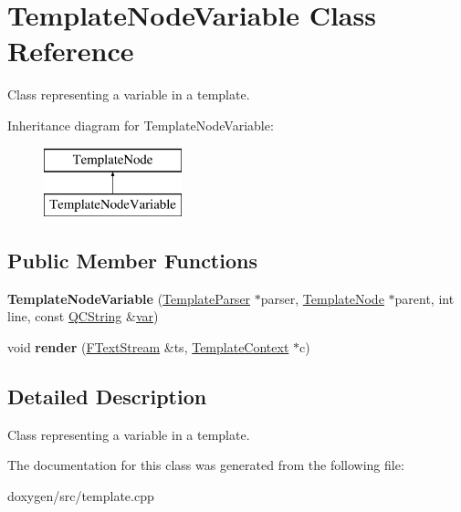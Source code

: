 \hypertarget{class_template_node_variable}{}\section{Template\+Node\+Variable Class Reference}
\label{class_template_node_variable}


Class representing a variable in a template.  


Inheritance diagram for Template\+Node\+Variable\+:\begin{figure}[H]
\begin{center}
\leavevmode
\includegraphics[height=2.000000cm]{class_template_node_variable}
\end{center}
\end{figure}
\subsection*{Public Member Functions}
\begin{DoxyCompactItemize}
\item 
\mbox{\label{class_template_node_variable_a88ef0bf11eea396aabd089bdd84c7ebc}} 
{\bfseries Template\+Node\+Variable} (\mbox{\hyperlink{class_template_parser}{Template\+Parser}} $\ast$parser, \mbox{\hyperlink{class_template_node}{Template\+Node}} $\ast$parent, int line, const \mbox{\hyperlink{class_q_c_string}{Q\+C\+String}} \&\mbox{\hyperlink{018__def_8c_a335628f2e9085305224b4f9cc6e95ed5}{var}})
\item 
\mbox{\label{class_template_node_variable_add7776f2a65f50b43bbf3802837a5c49}} 
void {\bfseries render} (\mbox{\hyperlink{class_f_text_stream}{F\+Text\+Stream}} \&ts, \mbox{\hyperlink{class_template_context}{Template\+Context}} $\ast$c)
\end{DoxyCompactItemize}


\subsection{Detailed Description}
Class representing a variable in a template. 

The documentation for this class was generated from the following file\+:\begin{DoxyCompactItemize}
\item 
doxygen/src/template.\+cpp\end{DoxyCompactItemize}

